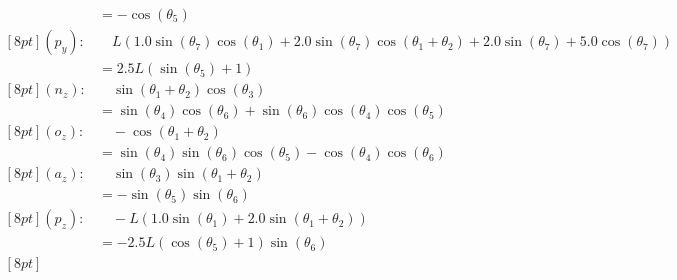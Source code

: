 \documentclass[12pt, a4paper]{article}
\begin{document}
\begin{align}
&= - \cos{\left(\theta_{5} \right)} \\ [8pt] 
(p_{y}): & \quad L \left(1.0 \sin{\left(\theta_{7} \right)} \cos{\left(\theta_{1} \right)} + 2.0 \sin{\left(\theta_{7} \right)} \cos{\left(\theta_{1} + \theta_{2} \right)} + 2.0 \sin{\left(\theta_{7} \right)} + 5.0 \cos{\left(\theta_{7} \right)}\right) \\ 
&= 2.5 L \left(\sin{\left(\theta_{5} \right)} + 1\right) \\ [8pt] 
(n_{z}): & \quad \sin{\left(\theta_{1} + \theta_{2} \right)} \cos{\left(\theta_{3} \right)} \\ 
&= \sin{\left(\theta_{4} \right)} \cos{\left(\theta_{6} \right)} + \sin{\left(\theta_{6} \right)} \cos{\left(\theta_{4} \right)} \cos{\left(\theta_{5} \right)} \\ [8pt] 
(o_{z}): & \quad - \cos{\left(\theta_{1} + \theta_{2} \right)} \\ 
&= \sin{\left(\theta_{4} \right)} \sin{\left(\theta_{6} \right)} \cos{\left(\theta_{5} \right)} - \cos{\left(\theta_{4} \right)} \cos{\left(\theta_{6} \right)} \\ [8pt] 
(a_{z}): & \quad \sin{\left(\theta_{3} \right)} \sin{\left(\theta_{1} + \theta_{2} \right)} \\ 
&= - \sin{\left(\theta_{5} \right)} \sin{\left(\theta_{6} \right)} \\ [8pt] 
(p_{z}): & \quad - L \left(1.0 \sin{\left(\theta_{1} \right)} + 2.0 \sin{\left(\theta_{1} + \theta_{2} \right)}\right) \\ 
&= - 2.5 L \left(\cos{\left(\theta_{5} \right)} + 1\right) \sin{\left(\theta_{6} \right)} \\ [8pt] 
\end{align}

\newpage
\end{document}
